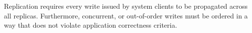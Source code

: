 



Replication requires every write issued by system clients to be
propagated across all replicas. Furthermore, concurrent, or out-of-order writes
must be ordered in a way that does not violate application correctness criteria.  



